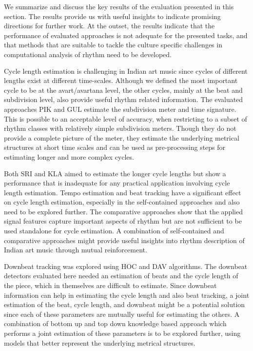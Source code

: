 We summarize and discuss the key results of the evaluation presented in this section. The results provide us with useful insights to indicate promising directions for further work. At the outset, the results indicate that the performance of evaluated approaches is not adequate for the presented tasks, and that methods that are suitable to tackle the culture specific challenges in computational analysis of rhythm need to be developed. 

Cycle length estimation is challenging in Indian art music since cycles of different lengths exist at different time-scales. Although we defined the most important cycle to be at the \gls{avart}/\gls{avartana} level, the other cycles, mainly at the beat and subdivision level, also provide useful rhythm related information. The evaluated approaches \acrshort{PIK} and \acrshort{GUL} estimate the subdivision meter and time signature. This is possible to an acceptable level of accuracy, when restricting to a subset of rhythm classes with relatively simple subdivision meters. Though they do not provide a complete picture of the meter, they estimate the underlying metrical structures at short time scales and can be used as pre-processing steps for estimating longer and more complex cycles. 

Both \acrshort{SRI} and \acrshort{KLA} aimed to estimate the longer cycle lengths but show a performance that is inadequate for any practical application involving cycle length estimation. Tempo estimation and beat tracking have a significant effect on cycle length estimation, especially in the self-contained approaches and also need to be explored further. The comparative approaches show that the applied signal features capture important aspects of rhythm but are not sufficient to be used standalone for cycle estimation. A combination of self-contained and comparative approaches might provide useful insights into rhythm description of Indian art music through mutual reinforcement. %

Downbeat tracking was explored using \acrshort{HOC} and \acrshort{DAV} algorithms. The downbeat detectors evaluated here needed an estimation of beats and the cycle length of the piece, which in themselves are difficult to estimate. Since downbeat information can help in estimating the cycle length and also beat tracking, a joint estimation of the beat, cycle length, and downbeat might be a potential solution since each of these parameters are mutually useful for estimating the others. A combination of bottom up and top down knowledge based approach which performs a joint estimation of these parameters is to be explored further, using models that better represent the underlying metrical structures. 

